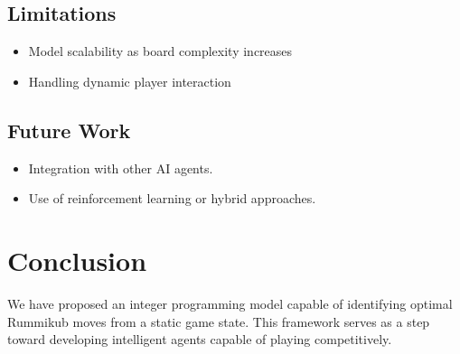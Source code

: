\documentclass[12pt]{article}
\begin{document}
\subsection{Limitations}
\begin{itemize}
    \item Model scalability as board complexity increases
    \item Handling dynamic player interaction
\end{itemize}

\subsection{Future Work}
\begin{itemize}
    \item Integration with other AI agents.
    \item Use of reinforcement learning or hybrid approaches.
\end{itemize}

\section{Conclusion}
We have proposed an integer programming model capable of identifying optimal Rummikub moves from a static game state. This framework serves as a step toward developing intelligent agents capable of playing competitively.



\end{document}
